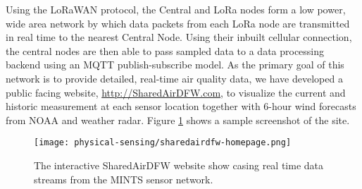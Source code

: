 Using the LoRaWAN protocol, the Central and LoRa nodes form a low power, wide area network by which data packets from each LoRa node are transmitted in real time to the nearest Central Node. Using their inbuilt cellular connection, the central nodes are then able to pass sampled data to a data processing backend using an MQTT publish-subscribe model. As the primary goal of this network is to provide detailed, real-time air quality data, we have developed a public facing website, \url{http://SharedAirDFW.com}, to visualize the current and historic measurement at each sensor location together with 6-hour wind forecasts from NOAA and weather radar. Figure \ref{fig:sharedair-site} shows a sample screenshot of the site.
\begin{figure}[!hbt]
  \centering
  \texttt{[image: physical-sensing/sharedairdfw-homepage.png]}
  \caption{The interactive SharedAirDFW website show casing real time data streams from the MINTS sensor network.}
  \label{fig:sharedair-site}
\end{figure}

